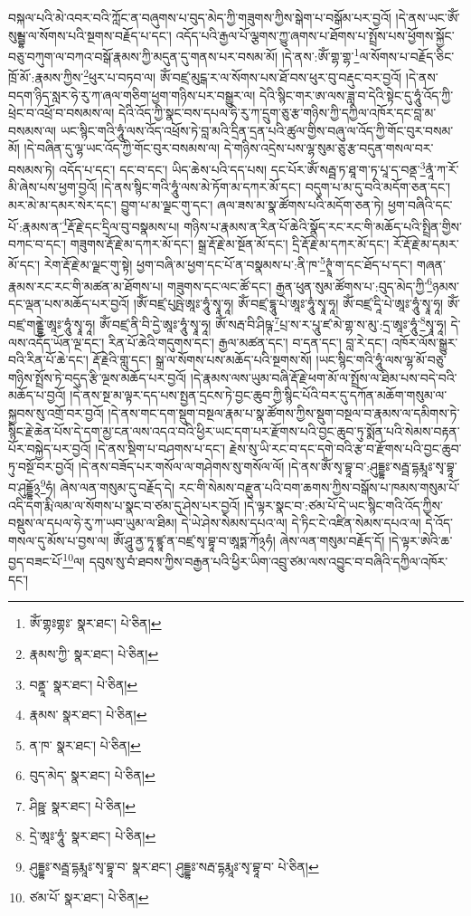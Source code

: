 བསྐལ་པའི་མེ་འབར་བའི་ཀློང་ན་བཞུགས་པ་བུད་མེད་ཀྱི་གཟུགས་ཀྱིས་སྒེག་པ་བསྒོམ་པར་བྱའོ། །དེ་ནས་ཡང་ཨོཾ་སུམྦྷ་ལ་སོགས་པའི་སྔགས་བརྗོད་པ་དང་། འདོད་པའི་རྒྱལ་པོ་ལྕགས་ཀྱུ་ཞགས་པ་ཐོགས་པ་སྤྲོས་པས་ཕྱོགས་སྐྱོང་བཅུ་བཀུག་ལ་བཀའ་བསྒོ་རྣམས་ཀྱི་མདུན་དུ་གནས་པར་བསམ་མོ། །དེ་ནས་:ཨོཾ་གྷ་གྷ་\footnote{ཨོཾ་གྷཿགྷཿ་  སྣར་ཐང་།  པེ་ཅིན། }ལ་སོགས་པ་བརྗོད་ཅིང་ཁྲོ་མོ་:རྣམས་ཀྱིས་\footnote{རྣམས་ཀྱི་  སྣར་ཐང་།  པེ་ཅིན། }ཕུར་པ་བཏབ་ལ། ཨོཾ་བཛྲ་མུངྒ་ར་ལ་སོགས་པས་ཐོ་བས་ཕུར་བུ་བརྡུང་བར་བྱའོ། །དེ་ནས་བདག་ཉིད་སླར་ཧེ་རུ་ཀ་ཞལ་གཅིག་ཕྱག་གཉིས་པར་བསྒྱུར་ལ། དེའི་སྙིང་གར་ཨ་ལས་ཟླ་བ་དེའི་སྟེང་དུ་ཧཱུཾ་འོད་ཀྱི་ཕྲེང་བ་འཕྲོ་བ་བསམས་ལ། དེའི་འོད་ཀྱི་སྣང་བས་དཔལ་ཧེ་རུ་ཀ་དྲུག་ཅུ་རྩ་གཉིས་ཀྱི་དཀྱིལ་འཁོར་དང་བླ་མ་བསམས་ལ། ཡང་སྙིང་གའི་ཧཱུཾ་ལས་འོད་འཕྲོས་ཏེ་བླ་མའི་དྲིན་དྲན་པའི་ཚུལ་གྱིས་བཞུ་ལ་འོད་ཀྱི་གོང་བུར་བསམ་མོ། །དེ་བཞིན་དུ་ལྷ་ཡང་འོད་ཀྱི་གོང་བུར་བསམས་ལ། དེ་གཉིས་འདྲེས་པས་ལྷ་སུམ་ཅུ་རྩ་བདུན་གསལ་བར་བསམས་ཏེ། འདོད་པ་དང་། དང་བ་དང་། ཡིད་ཆེས་པའི་དད་པས། དང་པོར་ཨོཾ་སརྦྦ་ཏ་ཐཱ་ག་ཏ་པཱ་ད་བནྡ་\footnote{བནྡཱ་  སྣར་ཐང་།  པེ་ཅིན། }ནཱཾ་ཀ་རོ་མི་ཞེས་པས་ཕྱག་བྱའོ། །དེ་ནས་སྙིང་གའི་ཧཱུཾ་ལས་མེ་ཏོག་མ་དཀར་མོ་དང་། བདུག་པ་མ་དུ་བའི་མདོག་ཅན་དང་། མར་མེ་མ་དམར་སེར་དང་། བྱུག་པ་མ་ལྗང་གུ་དང་། ཞལ་ཟས་མ་སྣ་ཚོགས་པའི་མདོག་ཅན་ཏེ། ཕྱག་བཞིའི་དང་པོ་:རྣམས་ན་\footnote{རྣམས་  སྣར་ཐང་།  པེ་ཅིན། }རྡོ་རྗེ་དང་དྲིལ་བུ་བསྣམས་པ། གཉིས་པ་རྣམས་ན་རིན་པོ་ཆེའི་སྣོད་རང་རང་གི་མཆོད་པའི་སྤྲིན་གྱིས་བཀང་བ་དང་། གཟུགས་རྡོ་རྗེ་མ་དཀར་མོ་དང་། སྒྲ་རྡོ་རྗེ་མ་སྔོན་མོ་དང་། དྲི་རྡོ་རྗེ་མ་དཀར་མོ་དང་། རོ་རྡོ་རྗེ་མ་དམར་མོ་དང་། རེག་རྡོ་རྗེ་མ་ལྗང་གུ་སྟེ། ཕྱག་བཞི་མ་ཕྱག་དང་པོ་ན་བསྣམས་པ་:ནི་ཁ་\footnote{ན་ཁ་  སྣར་ཐང་།  པེ་ཅིན། }ཊྭཱཾ་ག་དང་ཐོད་པ་དང་། གཞན་རྣམས་རང་རང་གི་མཚན་མ་ཐོགས་པ། གཟུགས་དང་ལང་ཚོ་དང་། རྒྱན་ཕུན་སུམ་ཚོགས་པ་:བུད་མེད་ཀྱི་\footnote{བུད་མེད་  སྣར་ཐང་།  པེ་ཅིན། }ཉམས་དང་ལྡན་པས་མཆོད་པར་བྱའོ། །ཨོཾ་བཛྲ་པུཥྤེ་ཨཱཿ་ཧཱུཾ་སྭཱ་ཧཱ། ཨོཾ་བཛྲ་དྷཱུ་པེ་ཨཱཿ་ཧཱུཾ་སྭཱ་ཧཱ། ཨོཾ་བཛྲ་དཱི་པེ་ཨཱཿ་ཧཱུཾ་སྭཱ་ཧཱ། ཨོཾ་བཛྲ་གནྡྷེ་ཨཱཿ་ཧཱུཾ་སྭཱ་ཧཱ། ཨོཾ་བཛྲ་ནི་བི་དྱེ་ཨཱཿ་ཧཱུཾ་སྭཱ་ཧཱ། ཨོཾ་སརྦ་བི་ཤིཥྚ་\footnote{ཤིཥྛ་  སྣར་ཐང་།  པེ་ཅིན། }པྲ་ས་ར་པཱུ་ཛ་མེ་གྷ་ས་མུ་:དྲ་ཨཱཿ་ཧཱུཾ་\footnote{དྲེ་ཨཱཿ་ཧཱུཾ་  སྣར་ཐང་།  པེ་ཅིན། }སྭཱ་ཧཱ། དེ་ལས་འདོད་ཡོན་ལྔ་དང་། རིན་པོ་ཆེའི་གདུགས་དང་། རྒྱལ་མཚན་དང་། བ་དན་དང་། བླ་རེ་དང་། འཁོར་ལོས་སྒྱུར་བའི་རིན་པོ་ཆེ་དང་། རྡོ་རྗེའི་གླུ་དང་། སྒྲ་ལ་སོགས་པས་མཆོད་པའི་སྔགས་སོ། །ཡང་སྙིང་གའི་ཧཱུཾ་ལས་ལྷ་མོ་བཅུ་གཉིས་སྤྲོས་ཏེ་བདུད་རྩི་ལྔས་མཆོད་པར་བྱའོ། །དེ་རྣམས་ལས་ཡུམ་བཞི་རྡོ་རྗེ་ཕག་མོ་ལ་སྤྲོས་ལ་ཐིམ་པས་བདེ་བའི་མཆོད་པ་བྱའོ། །དེ་ནས་སྔ་མ་ལྟར་དད་པས་སྤྱན་དྲངས་ཏེ་བྱང་ཆུབ་ཀྱི་སྙིང་པོའི་བར་དུ་དཀོན་མཆོག་གསུམ་ལ་སྐྱབས་སུ་འགྲོ་བར་བྱའོ། །དེ་ནས་གང་དག་སྡུག་བསྔལ་རྣམ་པ་སྣ་ཚོགས་ཀྱིས་སྡུག་བསྔལ་བ་རྣམས་ལ་དམིགས་ཏེ་སྙིང་རྗེ་ཆེན་པོས་དེ་དག་མྱ་ངན་ལས་འདའ་བའི་ཕྱིར་ཡང་དག་པར་རྫོགས་པའི་བྱང་ཆུབ་ཏུ་སྨོན་པའི་སེམས་བརྟན་པོར་བསྐྱེད་པར་བྱའོ། །དེ་ནས་སྡིག་པ་བཤགས་པ་དང་། རྗེས་སུ་ཡི་རང་བ་དང་དགེ་བའི་རྩ་བ་རྫོགས་པའི་བྱང་ཆུབ་ཏུ་བསྔོ་བར་བྱའོ། །དེ་ནས་བཟོད་པར་གསོལ་ལ་གཤེགས་སུ་གསོལ་ལོ། །དེ་ནས་ཨོཾ་སྭ་བྷཱ་བ་:ཤུདྡྷཿ་སརྦྦ་དྷརྨཱཿ་སྭ་བྷཱ་བ་ཤུདྡྷོ྅\footnote{ཤུདྡྷཿ་སརྦྦ་དྷརྨཱཿ་སྭ་བྷཱ་བ་  སྣར་ཐང་། ཤུདྡྷཿ་སརྦ་དྷརྨཱཿ་སྭ་བྷཱ་བ་  པེ་ཅིན། }ཧཾ། ཞེས་ལན་གསུམ་དུ་བརྗོད་དེ། རང་གི་སེམས་བརྫུན་པའི་བག་ཆགས་ཀྱིས་བསྒོས་པ་ཁམས་གསུམ་པོ་འདི་དག་རྨི་ལམ་ལ་སོགས་པ་སྣང་བ་ཙམ་དུ་ཤེས་པར་བྱའོ། །དེ་ལྟར་སྣང་བ་:ཙམ་པོ་དེ་ཡང་སྙིང་གའི་འོད་ཀྱིས་བསྡུས་ལ་དཔལ་ཧེ་རུ་ཀ་ཡབ་ཡུམ་ལ་ཐིམ། དེ་ཡེ་ཤེས་སེམས་དཔའ་ལ། དེ་ཏིང་ངེ་འཛིན་སེམས་དཔའ་ལ། དེ་འོད་གསལ་དུ་མོས་པ་བྱས་ལ། ཨོཾ་ཤཱུ་ནྱ་ཏཱ་ཛྙཱ་ན་བཛྲ་སྭ་བྷཱ་བ་ཨཱཏྨ་ཀོ྅ཧཾ། ཞེས་ལན་གསུམ་བརྗོད་དོ། །དེ་ལྟར་ཨེའི་ཆ་བྱད་བཟང་པོ་\footnote{ཙམ་པོ་  སྣར་ཐང་།  པེ་ཅིན། }ལ། དབུས་སུ་བཾ་ཐབས་ཀྱིས་བརྒྱན་པའི་ཕྱིར་ཡིག་འབྲུ་ཙམ་ལས་འབྱུང་བ་བཞིའི་དཀྱིལ་འཁོར་དང་། 